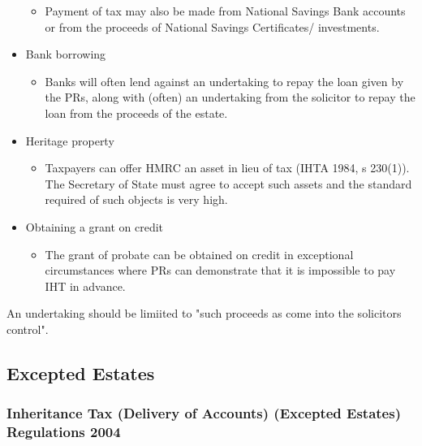 \documentclass[
]{article}
\newenvironment{Shaded}{}{}
\newcommand{\NormalTok}[1]{#1}
\providecommand{\tightlist}{%
  \setlength{\itemsep}{0pt}\setlength{\parskip}{0pt}}
\begin{document}
\begin{itemize}
  \begin{itemize}
  \tightlist
  \item
    Payment of tax may also be made from National Savings Bank accounts
    or from the proceeds of National Savings Certificates/ investments.
  \end{itemize}
\item
  Bank borrowing

  \begin{itemize}
  \tightlist
  \item
    Banks will often lend against an undertaking to repay the loan given
    by the PRs, along with (often) an undertaking from the solicitor to
    repay the loan from the proceeds of the estate.
  \end{itemize}
\item
  Heritage property

  \begin{itemize}
  \tightlist
  \item
    Taxpayers can offer HMRC an asset in lieu of tax (IHTA 1984, s
    230(1)). The Secretary of State must agree to accept such assets and
    the standard required of such objects is very high.
  \end{itemize}
\item
  Obtaining a grant on credit

  \begin{itemize}
  \tightlist
  \item
    The grant of probate can be obtained on credit in exceptional
    circumstances where PRs can demonstrate that it is impossible to pay
    IHT in advance.
  \end{itemize}
\end{itemize}

\begin{Shaded}
\begin{Highlighting}[]
\NormalTok{An undertaking should be limiited to "such proceeds as come into the solicitor\textquotesingle{}s control".}
\end{Highlighting}
\end{Shaded}

\hypertarget{excepted-estates}{%
\subsection{Excepted Estates}\label{excepted-estates}}

\hypertarget{inheritance-tax-delivery-of-accounts-excepted-estates-regulations-2004}{%
\subsubsection{Inheritance Tax (Delivery of Accounts) (Excepted Estates)
Regulations
2004}\label{inheritance-tax-delivery-of-accounts-excepted-estates-regulations-2004}}
\end{document}
